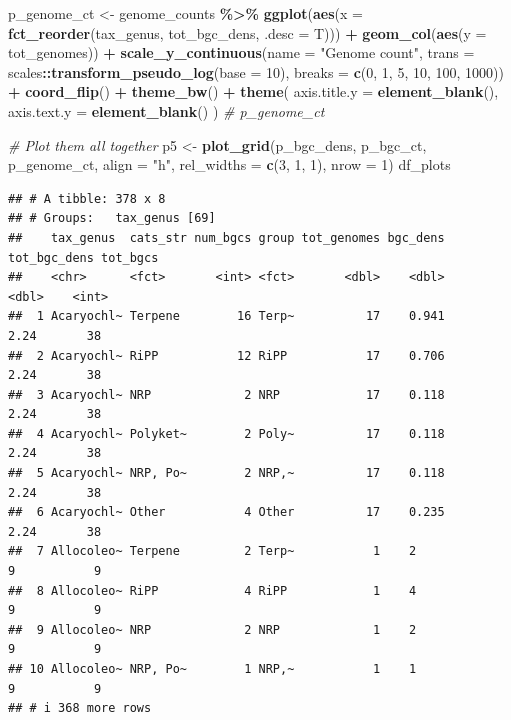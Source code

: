 \documentclass[
]{article}
\newenvironment{Shaded}{\begin{snugshade}}{\end{snugshade}}
\newcommand{\AttributeTok}[1]{\textcolor[rgb]{0.13,0.29,0.53}{#1}}
\newcommand{\CommentTok}[1]{\textcolor[rgb]{0.56,0.35,0.01}{\textit{#1}}}
\newcommand{\DecValTok}[1]{\textcolor[rgb]{0.00,0.00,0.81}{#1}}
\newcommand{\FunctionTok}[1]{\textcolor[rgb]{0.13,0.29,0.53}{\textbf{#1}}}
\newcommand{\NormalTok}[1]{#1}
\newcommand{\OtherTok}[1]{\textcolor[rgb]{0.56,0.35,0.01}{#1}}
\newcommand{\SpecialCharTok}[1]{\textcolor[rgb]{0.81,0.36,0.00}{\textbf{#1}}}
\newcommand{\StringTok}[1]{\textcolor[rgb]{0.31,0.60,0.02}{#1}}
\begin{document}
\begin{Shaded}
\begin{Highlighting}[]
\NormalTok{p\_genome\_ct }\OtherTok{\textless{}{-}}\NormalTok{ genome\_counts }\SpecialCharTok{\%\textgreater{}\%}
  \FunctionTok{ggplot}\NormalTok{(}\FunctionTok{aes}\NormalTok{(}\AttributeTok{x =} \FunctionTok{fct\_reorder}\NormalTok{(tax\_genus, tot\_bgc\_dens, }\AttributeTok{.desc =}\NormalTok{ T))) }\SpecialCharTok{+}
  \FunctionTok{geom\_col}\NormalTok{(}\FunctionTok{aes}\NormalTok{(}\AttributeTok{y =}\NormalTok{ tot\_genomes)) }\SpecialCharTok{+}
  \FunctionTok{scale\_y\_continuous}\NormalTok{(}\AttributeTok{name =} \StringTok{"Genome count"}\NormalTok{, }\AttributeTok{trans =}\NormalTok{ scales}\SpecialCharTok{::}\FunctionTok{transform\_pseudo\_log}\NormalTok{(}\AttributeTok{base =} \DecValTok{10}\NormalTok{), }\AttributeTok{breaks =} \FunctionTok{c}\NormalTok{(}\DecValTok{0}\NormalTok{, }\DecValTok{1}\NormalTok{, }\DecValTok{5}\NormalTok{, }\DecValTok{10}\NormalTok{, }\DecValTok{100}\NormalTok{, }\DecValTok{1000}\NormalTok{)) }\SpecialCharTok{+}
  \FunctionTok{coord\_flip}\NormalTok{() }\SpecialCharTok{+}
  \FunctionTok{theme\_bw}\NormalTok{() }\SpecialCharTok{+}
  \FunctionTok{theme}\NormalTok{(}
    \AttributeTok{axis.title.y =} \FunctionTok{element\_blank}\NormalTok{(),}
    \AttributeTok{axis.text.y =} \FunctionTok{element\_blank}\NormalTok{()}
\NormalTok{  )}
\CommentTok{\# p\_genome\_ct}

\CommentTok{\# Plot them all together}
\NormalTok{p5 }\OtherTok{\textless{}{-}} \FunctionTok{plot\_grid}\NormalTok{(p\_bgc\_dens, p\_bgc\_ct, p\_genome\_ct, }\AttributeTok{align =} \StringTok{"h"}\NormalTok{, }\AttributeTok{rel\_widths =} \FunctionTok{c}\NormalTok{(}\DecValTok{3}\NormalTok{, }\DecValTok{1}\NormalTok{, }\DecValTok{1}\NormalTok{), }\AttributeTok{nrow =} \DecValTok{1}\NormalTok{)}
\NormalTok{df\_plots}
\end{Highlighting}
\end{Shaded}

\begin{verbatim}
## # A tibble: 378 x 8
## # Groups:   tax_genus [69]
##    tax_genus  cats_str num_bgcs group tot_genomes bgc_dens tot_bgc_dens tot_bgcs
##    <chr>      <fct>       <int> <fct>       <dbl>    <dbl>        <dbl>    <int>
##  1 Acaryochl~ Terpene        16 Terp~          17    0.941         2.24       38
##  2 Acaryochl~ RiPP           12 RiPP           17    0.706         2.24       38
##  3 Acaryochl~ NRP             2 NRP            17    0.118         2.24       38
##  4 Acaryochl~ Polyket~        2 Poly~          17    0.118         2.24       38
##  5 Acaryochl~ NRP, Po~        2 NRP,~          17    0.118         2.24       38
##  6 Acaryochl~ Other           4 Other          17    0.235         2.24       38
##  7 Allocoleo~ Terpene         2 Terp~           1    2             9           9
##  8 Allocoleo~ RiPP            4 RiPP            1    4             9           9
##  9 Allocoleo~ NRP             2 NRP             1    2             9           9
## 10 Allocoleo~ NRP, Po~        1 NRP,~           1    1             9           9
## # i 368 more rows
\end{verbatim}
\end{document}
